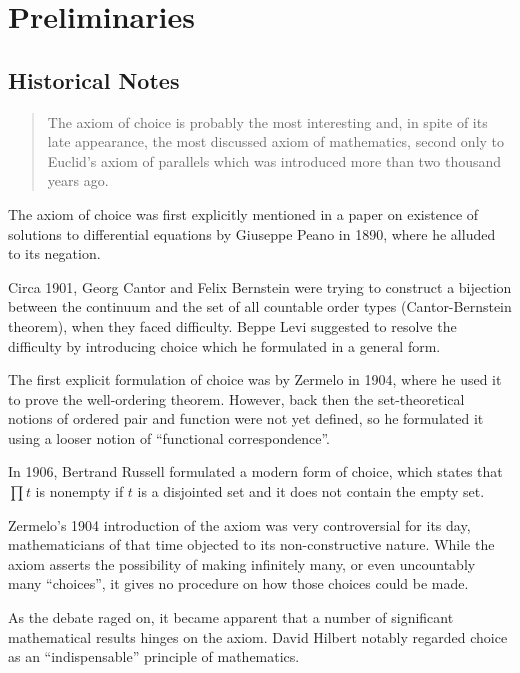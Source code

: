 \chapter{Preliminaries}
\section{Historical Notes}

\begin{quote}
    The axiom of choice is probably the most interesting and, in spite of its late appearance, the most discussed axiom of mathematics,
    second only to Euclid's axiom of parallels which was introduced more than two thousand years ago. \autocite{fraenkel1973}
\end{quote}
The axiom of choice was first explicitly mentioned in a paper on existence of solutions to differential equations by Giuseppe Peano in 1890,
where he alluded to its negation.

Circa 1901, Georg Cantor and Felix Bernstein were trying to construct a bijection between the continuum and the set of all countable order types (Cantor-Bernstein theorem), when they faced difficulty. Beppe Levi suggested to resolve the difficulty by introducing choice which he formulated in a general form.

The first explicit formulation of choice was by Zermelo in 1904, where he used it to prove the well-ordering theorem.
However, back then the set-theoretical notions of ordered pair and function were not yet defined, so he formulated it using a looser notion of ``functional correspondence''.

In 1906, Bertrand Russell formulated a modern form of choice, which states that \(\prod t\) is nonempty if \(t\) is a disjointed set and it does not contain the empty set.


Zermelo's 1904 introduction of the axiom was very controversial for its day, mathematicians of that time objected to its non-constructive nature.
While the axiom asserts the possibility of making infinitely many, or even uncountably many ``choices'', it gives no procedure on how those choices could be made.

As the debate raged on, it became apparent that a number of significant mathematical results hinges on the axiom.
David Hilbert notably regarded choice as an ``indispensable'' principle of mathematics.

